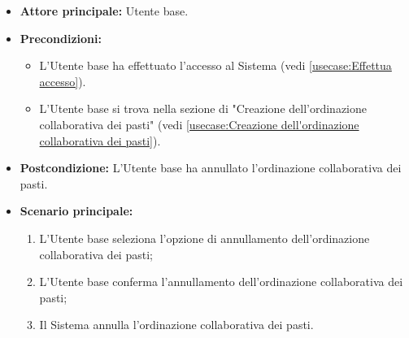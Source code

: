 \label{usecase:Annullamento dell'ordinazione}
\begin{itemize}
	\item \textbf{Attore principale:} Utente base.

	\item \textbf{Precondizioni:}
	\begin{itemize}
		\item L'Utente base ha effettuato l'accesso al Sistema (vedi \autoref{usecase:Effettua accesso}).
		\item L'Utente base si trova nella sezione di "Creazione dell'ordinazione collaborativa dei pasti" (vedi \autoref{usecase:Creazione dell'ordinazione collaborativa dei pasti}).
	\end{itemize}

	\item \textbf{Postcondizione:}
	      L'Utente base ha annullato l'ordinazione collaborativa dei pasti.

	\item \textbf{Scenario principale:}
	      \begin{enumerate}
		      \item L'Utente base seleziona l'opzione di annullamento
		            dell'ordinazione collaborativa dei pasti;

		      \item L'Utente base conferma l'annullamento dell'ordinazione
		            collaborativa dei pasti;

		      \item Il Sistema annulla l'ordinazione collaborativa dei pasti.
	      \end{enumerate}
\end{itemize}
